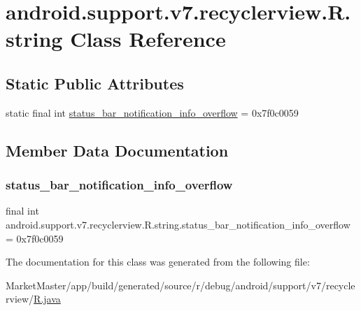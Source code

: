 \hypertarget{classandroid_1_1support_1_1v7_1_1recyclerview_1_1R_1_1string}{}\section{android.\+support.\+v7.\+recyclerview.\+R.\+string Class Reference}
\label{classandroid_1_1support_1_1v7_1_1recyclerview_1_1R_1_1string}
\subsection*{Static Public Attributes}
\begin{DoxyCompactItemize}
\item 
static final int \mbox{\hyperlink{classandroid_1_1support_1_1v7_1_1recyclerview_1_1R_1_1string_a1ea81bbbfacad9218b17fd12e0b9b258}{status\+\_\+bar\+\_\+notification\+\_\+info\+\_\+overflow}} = 0x7f0c0059
\end{DoxyCompactItemize}


\subsection{Member Data Documentation}
\mbox{\label{classandroid_1_1support_1_1v7_1_1recyclerview_1_1R_1_1string_a1ea81bbbfacad9218b17fd12e0b9b258}} 
\subsubsection{\texorpdfstring{status\+\_\+bar\+\_\+notification\+\_\+info\+\_\+overflow}{status\_bar\_notification\_info\_overflow}}
{\footnotesize\ttfamily final int android.\+support.\+v7.\+recyclerview.\+R.\+string.\+status\+\_\+bar\+\_\+notification\+\_\+info\+\_\+overflow = 0x7f0c0059\hspace{0.3cm}{\ttfamily [static]}}



The documentation for this class was generated from the following file\+:\begin{DoxyCompactItemize}
\item 
Market\+Master/app/build/generated/source/r/debug/android/support/v7/recyclerview/\mbox{\hyperlink{debug_2android_2support_2v7_2recyclerview_2R_8java}{R.\+java}}\end{DoxyCompactItemize}
